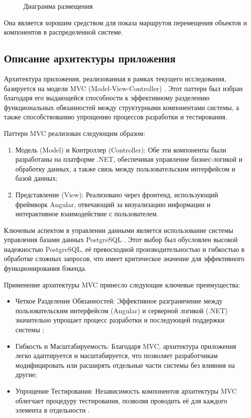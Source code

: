 \begin{figure}[ht]
\caption{Диаграмма размещения}
\label{place:image}
\end{figure}

Она является хорошим средством для показа маршрутов перемещения объектов и компонентов в распределенной системе.

\subsection{Описание архитектуры приложения}

Архитектура приложения, реализованная в рамках текущего исследования, базируется на модели MVC (Model-View-Controller) \cite{kofman}. Этот паттерн был избран благодаря его выдающейся способности к эффективному разделению функциональных обязанностей между структурными компонентами системы, а также способствованию упрощению процессов разработки и тестирования.

Паттерн MVC реализован следующим образом:

\begin{enumerate}
    \item Модель (Model) и Контроллер (Controller): Обе эти компоненты были разработаны на платформе .NET, обеспечивая управление бизнес-логикой и обработку данных, а также связь между пользовательским интерфейсом и базой данных;
    \item Представление (View): Реализовано через фронтенд, использующий фреймворк Angular, отвечающий за визуализацию информации и интерактивное взаимодействие с пользователем.
\end{enumerate}

Ключевым аспектом в управлении данными является использование системы управления базами данных PostgreSQL \cite{kofman}. Этот выбор был обусловлен высокой надежностью PostgreSQL, её превосходной производительностью и гибкостью в обработке сложных запросов, что имеет критическое значение для эффективного функционирования бэкенда.

Применение архитектуры MVC принесло следующие ключевые преимущества:

\begin{itemize}
  \item   Четкое Разделение Обязанностей: Эффективное разграничение между пользовательским интерфейсом (Angular) и серверной логикой (.NET) значительно упрощает процесс разработки и последующей поддержки системы \cite{kofman};
  \item   Гибкость и Масштабируемость: Благодаря MVC, архитектура приложения легко адаптируется и масштабируется, что позволяет разработчикам модифицировать или расширять отдельные части системы без влияния на другие;
  \item   Упрощение Тестирования: Независимость компонентов архитектуры MVC облегчает процедуру тестирования, позволяя проводить её для каждого элемента в отдельности \cite{kofman}.
\end{itemize}

